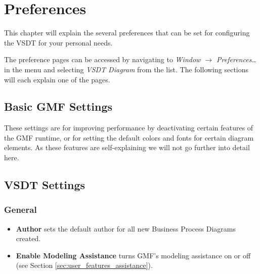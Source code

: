 \chapter{Preferences}
\label{sec:user_preferences}

This chapter will explain the several preferences that can be set for configuring
the VSDT for your personal needs.

The preference pages can be accessed by navigating to \emph{Window $\rightarrow$
Preferences\dots} in the menu and selecting \emph{VSDT Diagram} from the list.
The following sections will each explain one of the pages.



\section{Basic GMF Settings}
\label{sec:user_preferences_gmf}

These settings are for improving performance by deactivating certain features of
the GMF runtime, or for setting the default colors and fonts for certain diagram
elements.  As these features are self-explaining we will not go further into
detail here.



\section{VSDT Settings}
\label{sec:user_preferences_vsdt}


\subsection{General}
\begin{itemize}
	\item \textbf{Author} sets the default author for all new Business Process
	Diagrams created.
	
	\item \textbf{Enable Modeling Assistance} turns GMF's modeling assistance on
	or off (see Section \ref{sec:user_features_assistance}).
\end{itemize}	


